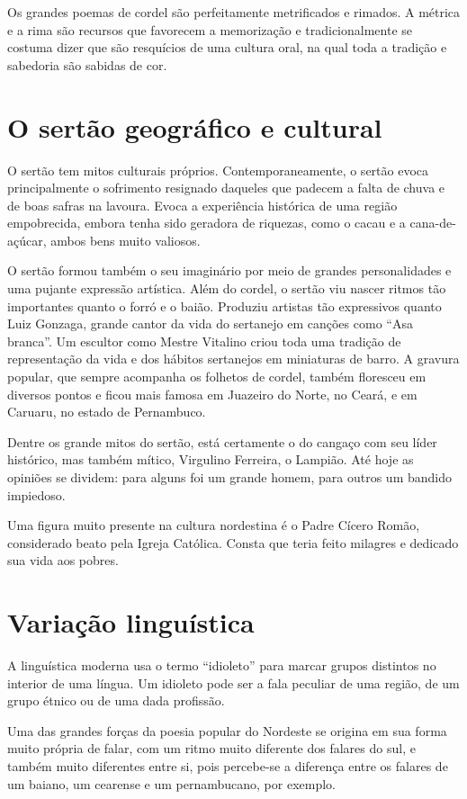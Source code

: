 Os grandes poemas de cordel são perfeitamente metrificados e rimados. A
métrica e a rima são recursos que favorecem a memorização e
tradicionalmente se costuma dizer que são resquícios de uma cultura
oral, na qual toda a tradição e sabedoria são sabidas de cor.

\section{O sertão geográfico e cultural}

O sertão tem mitos culturais próprios. Contemporaneamente, o sertão
evoca principalmente o sofrimento resignado daqueles que padecem a
falta de chuva e de boas safras na lavoura. Evoca a experiência
histórica de uma região empobrecida, embora tenha sido geradora de
riquezas, como o cacau e a cana-de-açúcar, ambos bens muito valiosos. 

O sertão formou também o seu imaginário por meio de grandes
personalidades e uma pujante expressão artística. Além do cordel, o
sertão viu nascer ritmos tão importantes quanto o forró e o baião.
Produziu artistas tão expressivos quanto Luiz Gonzaga, grande cantor da
vida do sertanejo em canções como ``Asa
branca''. Um escultor como Mestre Vitalino criou toda
uma tradição de representação da vida e dos hábitos sertanejos em
miniaturas de barro. A gravura popular, que sempre acompanha os
folhetos de cordel, também floresceu em diversos pontos e ficou mais
famosa em Juazeiro do Norte, no Ceará, e em Caruaru, no estado de
Pernambuco. 

Dentre os grande mitos do sertão, está certamente o do cangaço com seu
líder histórico, mas também mítico, Virgulino Ferreira, o Lampião. Até
hoje as opiniões se dividem: para alguns foi um grande homem, para
outros um bandido impiedoso. 

Uma figura muito presente na cultura nordestina é o Padre Cícero Romão,
considerado beato pela Igreja Católica. Consta que teria feito milagres
e dedicado sua vida aos pobres. 

\section{Variação linguística}

A linguística moderna usa o termo
``idioleto'' para marcar grupos
distintos no interior de uma língua. Um idioleto pode ser a fala
peculiar de uma região, de um grupo étnico ou de uma dada profissão. 

Uma das grandes forças da poesia popular do Nordeste se origina em sua
forma muito própria de falar, com um ritmo muito diferente dos falares
do sul, e também muito diferentes entre si, pois percebe-se a diferença
entre os falares de um baiano, um cearense e um pernambucano, por
exemplo.

